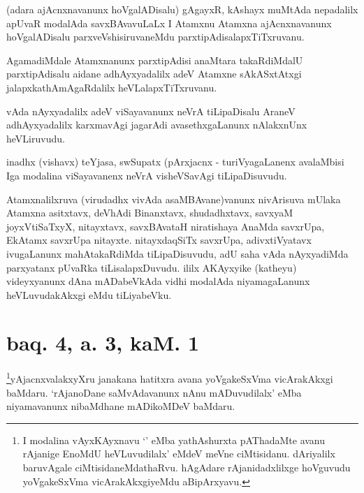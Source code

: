 \begin{artha}
(adara ajAcnxnavanunx hoVgalADisalu) gAgayxR, kAshayx muMtAda nepadalilx apUvaR modalAda savxBAvavuLaLx I Atamxnu Atamxna ajAcnxnavanunx hoVgalADisalu parxveVshisiruvaneMdu parxtipAdisalapxTiTxruvanu.
\end{artha}

\begin{artha}
AgamadiMdale Atamxnanunx parxtipAdisi anaMtara takaRdiMdalU parxtipAdisalu aidane adhAyxyadalilx adeV Atamxne sAkASxtAtxgi jalapxkathAmAgaRdalilx heVLalapxTiTxruvanu.
\end{artha}

\begin{artha}
vAda nAyxyadalilx adeV viSayavanunx neVrA tiLipaDisalu AraneV adhAyxyadalilx karxmavAgi jagarAdi avasethxgaLanunx nAlakxnUnx heVLiruvudu.
\end{artha}

\begin{artha}
inadhx (vishavx) teYjasa, swSupatx (pArxjacnx - turiVyagaLanenx avalaMbisi Iga modalina viSayavanenx neVrA visheVSavAgi tiLipaDisuvudu.
\end{artha}

\begin{artha}
Atamxnalilxruva (virudadhx vivAda asaMBAvane)vanunx nivArisuva mUlaka Atamxna asitxtavx, deVhAdi Binanxtavx, shudadhxtavx, savxyaM joyxVtiSaTxyX, nitayxtavx, savxBAvataH niratishaya AnaMda savxrUpa, EkAtamx savxrUpa nitayxte. nitayxdaqSiTx savxrUpa, adivxtiVyatavx ivugaLanunx mahAtakaRdiMda tiLipaDisuvudu, adU saha vAda nAyxyadiMda parxyatanx pUvaRka tiLisalapxDuvudu. ililx AKAyxyike (katheyu) videyxyanunx dAna mADabeVkAda vidhi modalAda niyamagaLanunx heVLuvudakAkxgi eMdu tiLiyabeVku.
\end{artha}

\section*{baq. 4, a. 3, kaM. 1}

\begin{artha}
\footnote{I modalina vAyxKAyxnavu `\stext' eMba yathAshurxta pAThadaMte avanu rAjanige EnoMdU heVLuvudilalx' eMdeV meVne ciMtisidanu. dAriyalilx baruvAgale ciMtisidaneMdathaRvu. hAgAdare rAjanidadxlilxge hoVguvudu yoVgakeSxVma vicArakAkxgiyeMdu aBipArxyavu.}yAjacnxvalakxyXru janakana hatitxra avana yoVgakeSxVma vicArakAkxgi baMdaru. `rAjanoDane saMvAdavanunx nAnu mADuvudilalx' eMba niyamavanunx nibaMdhane mADikoMDeV baMdaru.
\end{artha}

